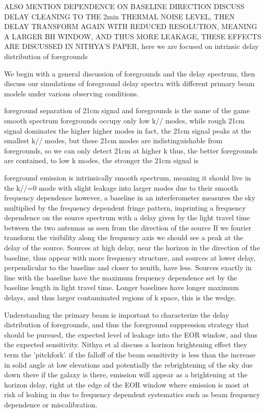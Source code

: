 \documentclass{emulateapj}
\begin{document}
ALSO MENTION DEPENDENCE ON BASELINE DIRECTION
DISCUSS DELAY CLEANING TO THE 2min THERMAL NOISE LEVEL, THEN DELAY TRANSFORM AGAIN WITH REDUCED RESOLUTION, MEANING A LARGER BH WINDOW, AND THUS MORE LEAKAGE, THESE EFFECTS ARE DISCUSSED IN NITHYA'S PAPER, here we are focused on intrinsic delay distribution of foregrounds

We begin with a general discussion of foregrounds and the delay spectrum, then discuss our simulations of foreground delay spectra with different primary beam models under various observing conditions. 

foreground separation of 21cm signal and foregrounds is the name of the game
smooth spectrum foregrounds occupy only low k// modes, while rough 21cm signal dominates the higher higher modes
in fact, the 21cm signal peaks at the smallest k// modes, but these 21cm modes are indistinguishable from foregrounds, so we can only detect 21cm at higher k
thus, the better foregrounds are contained, to low k modes, the stronger the 21cm signal is

foreground emission is intrinsically smooth spectrum, meaning it should live in the k//=0 mode with slight leakage into larger modes due to their smooth frequency dependence
however, a baseline in an interferometer measures the sky multiplied by the frequency dependent fringe pattern, imprinting a frequency dependence on the source spectrum with a delay given by the light travel time between the two antennas as seen from the direction of the source
If we fourier transform the visibility along the frequency axis we should see a peak at the delay of the source. Sources at high delay, near the horizon in the direction of the baseline, thus appear with more frequency structure, and sources at lower delay, perpendicular to the baseline and closer to zenith, have less. Sources exactly in line with the baseline have the maximum frequency dependence set by the baseline length in light travel time. Longer baselines have longer maximum delays, and thus larger contaminated regions of k space, this is the wedge. 

Understanding the primary beam is important to characterize the delay distribution of foregrounds, and thus the foreground suppression strategy that should be pursued, the expected level of leakage into the EOR window, and thus the expected sensitivity. Nithya et al discuss a horizon brightening effect they term the 'pitchfork'. if the falloff of the beam sensitivity is less than the increase in solid angle at low elevations and potentially the rebrightening of the sky due down there if the galaxy is there, emission will appear as a brightening at the horizon delay, right at the edge of the EOR window where emission is most at risk of leaking in due to frequency dependent systematics such as beam frequency dependence or miscalibration. 
\end{document}
